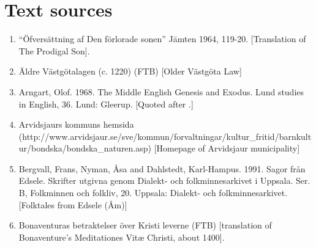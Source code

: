 
\chapter{Text sources}

\begin{enumerate}
\item[\sqbrSenum]  
“Öfversättning af Den förlorade sonen” Jämten 1964, 119-20. [Translation of The Prodigal Son]. 

\item[\sqbrSenum]  
\label{bkm:Ref154219978}Äldre Västgötalagen (c. 1220) (FTB) [Older Västgöta Law]


\item[\sqbrSenum]

\label{bkm:Ref151372879}Arngart, Olof. 1968. The Middle English Genesis and Exodus. Lund studies in English, 36. Lund: Gleerup. [Quoted after \citet{Allen1997}.]

\item[\sqbrSenum]

\label{bkm:Ref137879837}Arvidsjaurs kommuns hemsida (http://www.arvidsjaur.se/sve/kommun/forvaltningar/kultur\_fritid/barnkultur/bondska/bondska\_naturen.asp) [Homepage of Arvidsjaur municipality]


\item[\sqbrSenum]

\label{bkm:Ref150329670}Bergvall, Frans, Nyman, Åsa and Dahlstedt, Karl-Hampus. 1991. Sagor från Edsele. Skrifter utgivna genom Dialekt- och folkminnesarkivet i Uppsala. Ser. B, Folkminnen och folkliv, 20. Uppsala: Dialekt- och folkminnesarkivet. [Folktales from Edsele (Åm)]


\item[\sqbrSenum]

\label{bkm:Ref154213744}Bonaventuras betraktelser över Kristi leverne (FTB) [translation of Bonaventure’s Meditationes Vitæ Christi, about 1400]. 


\end{enumerate}
